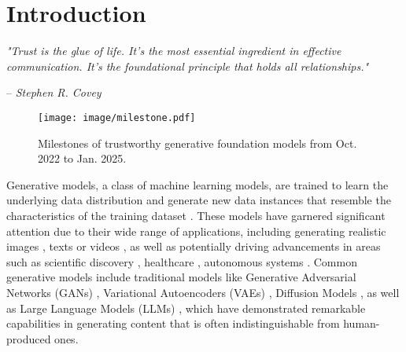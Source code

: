 \section{Introduction}


\textit{"Trust is the glue of life. It's the most essential ingredient in effective communication. It's the foundational principle that holds all relationships."}

\hfill -- \textit{Stephen R. Covey}

\begin{figure}[h]
    \centering
    \texttt{[image: image/milestone.pdf]}
    \caption{Milestones of trustworthy generative foundation models from Oct. 2022 to Jan. 2025.}
    \label{fig:milestone}
    \vspace{-5pt}
\end{figure}


Generative models, a class of machine learning models, are trained to learn the underlying data distribution and generate new data instances that resemble the characteristics of the training dataset \cite{harshvardhan2020comprehensive, cao2024survey}. These models have garnered significant attention due to their wide range of applications, including generating realistic images \cite{dalle3}, texts \cite{liang2024controllable, wu2024unigen} or videos \cite{liu2024sora}, as well as potentially driving advancements in areas such as scientific discovery \cite{zhang2023artificial, guo2023large, liang2024scemqa, zhang2024comprehensive}, healthcare \cite{bolton2024biomedlm, zhang2023biomedgpt, liu2023deidgpt, luo2023biomedgpt}, autonomous systems \cite{guo2024large, agentbench, metatool}. Common generative models include traditional models like Generative Adversarial Networks (GANs) \cite{goodfellow2014generative}, Variational Autoencoders (VAEs) \cite{kingma2013auto}, Diffusion Models \cite{yang2023diffusion}, as well as Large Language Models (LLMs) \cite{zhao2023survey}, which have demonstrated remarkable capabilities in generating content that is often indistinguishable from human-produced ones.

